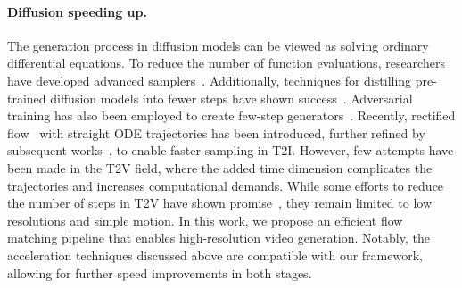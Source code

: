 \paragraph{Diffusion speeding up.} The generation process in diffusion models can be viewed as solving ordinary differential equations. To reduce the number of function evaluations, researchers have developed advanced samplers~\citep{song2020denoising, lu2022dpm, zhang2022fast}. Additionally, techniques for distilling pre-trained diffusion models into fewer steps have shown success~\citep{salimans2022progressive, meng2023distillation, yin2024one, nguyen2024swiftbrush, berthelot2023tract}. Adversarial training has also been employed to create few-step generators~\citep{xu2024ufogen, sauer2025adversarial, lin2024sdxl}. Recently, rectified flow~\citep{rectifiedflow} with straight ODE trajectories has been introduced, further refined by subsequent works~\citep{liu2023instaflow, yan_perflow_2024}, to enable faster sampling in T2I. However, few attempts have been made in the T2V field, where the added time dimension complicates the trajectories and increases computational demands. While some efforts to reduce the number of steps in T2V have shown promise~\citep{ding2024dollar}, they remain limited to low resolutions and simple motion. In this work, we propose an efficient flow matching pipeline that enables high-resolution video generation. Notably, the acceleration techniques discussed above are compatible with our framework, allowing for further speed improvements in both stages.